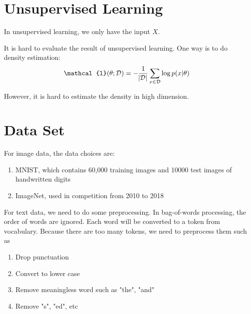 \section{Unsupervised Learning}

In unsupervised learning, we only have the input $X$.

It is hard to evaluate the result of unsupervised learning. One way is to do density estimation:
\begin{equation}
    \mathcal{l}(\theta; \mathcal{D}) = - \frac{1}{\absolutevalue{\mathcal{D}}} \sum_{x \in \mathcal{D}} \log p(x|\theta)
\end{equation}

However, it is hard to estimate the density in high dimension.



\section{Data Set}

\begin{example}
    For image data, the data choices are:
\begin{enumerate}
    \item MNIST, which contains 60,000 training images and 10000 test images of handwritten digits
    \item ImageNet, used in competition from 2010 to 2018
\end{enumerate}
\end{example}

\begin{definition}
    For text data, we need to do some preprocessing. In bag-of-words processing, the order of words are ignored. Each word will be converted to a token from vocabulary. Because there are too many tokens, we need to preprocess them such as 
\begin{enumerate}
    \item Drop punctuation
    \item Convert to lower case
    \item Remove meaningless word such as "the", "and"
    \item Remove "s", "ed", etc
\end{enumerate}
\end{definition}

